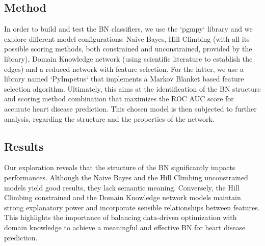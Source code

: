 \documentclass[letterpaper]{article}
\begin{document}
\subsection{Method}

In order to build and test the BN classifiers, we use the `pgmpy` library and we explore different model configurations: Naive Bayes, Hill Climbing (with all its possible scoring methods, both constrained and unconstrained, provided by the library), Domain Knowledge network (using scientific literature to establish the edges) and a reduced network with feature selection. For the latter, we use a library named `PyImpetus` that implements a Markov Blanket based feature selection algorithm.
Ultimately, this aims at the identification of the BN structure and scoring method combination that maximizes the ROC AUC score for accurate heart disease prediction. This chosen model is then subjected to further analysis, regarding the structure and the properties of the network.

\subsection{Results}


Our exploration reveals that the structure of the BN significantly impacts performances. Although the Naive Bayes and the Hill Climbing unconstrained models yield good results, they lack semantic meaning. Conversely, the Hill Climbing constrained and the Domain Knowledge network models maintain strong explanatory power and incorporate sensible relationships between features. This highlights the importance of balancing data-driven optimization with domain knowledge to achieve a meaningful and effective BN for heart disease prediction.
\end{document}
